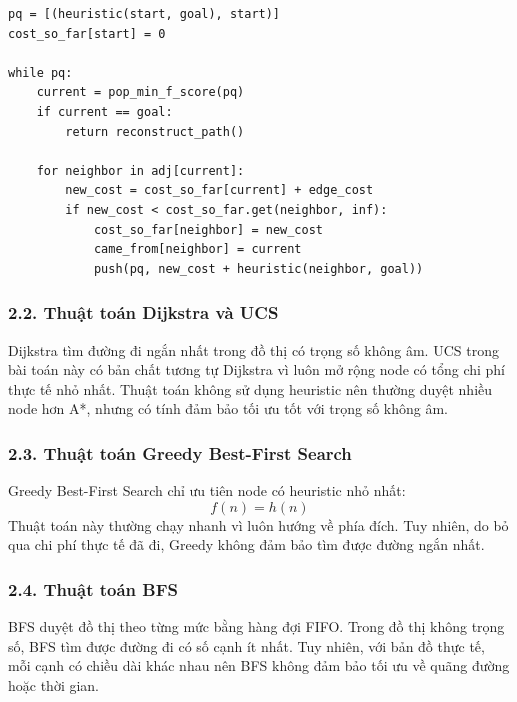 \documentclass[12pt,a4paper]{article}
\begin{document}
\begin{lstlisting}[style=pythonstyle, caption={Ý tưởng cài đặt thuật toán A*}]
pq = [(heuristic(start, goal), start)]
cost_so_far[start] = 0

while pq:
    current = pop_min_f_score(pq)
    if current == goal:
        return reconstruct_path()

    for neighbor in adj[current]:
        new_cost = cost_so_far[current] + edge_cost
        if new_cost < cost_so_far.get(neighbor, inf):
            cost_so_far[neighbor] = new_cost
            came_from[neighbor] = current
            push(pq, new_cost + heuristic(neighbor, goal))
\end{lstlisting}

\subsubsection*{2.2. Thuật toán Dijkstra và UCS}

Dijkstra tìm đường đi ngắn nhất trong đồ thị có trọng số không âm. UCS trong bài toán này có bản chất tương tự Dijkstra vì luôn mở rộng node có tổng chi phí thực tế nhỏ nhất. Thuật toán không sử dụng heuristic nên thường duyệt nhiều node hơn A*, nhưng có tính đảm bảo tối ưu tốt với trọng số không âm.

\subsubsection*{2.3. Thuật toán Greedy Best-First Search}

Greedy Best-First Search chỉ ưu tiên node có heuristic nhỏ nhất:
\[
f(n)=h(n)
\]
Thuật toán này thường chạy nhanh vì luôn hướng về phía đích. Tuy nhiên, do bỏ qua chi phí thực tế đã đi, Greedy không đảm bảo tìm được đường ngắn nhất.

\subsubsection*{2.4. Thuật toán BFS}

BFS duyệt đồ thị theo từng mức bằng hàng đợi FIFO. Trong đồ thị không trọng số, BFS tìm được đường đi có số cạnh ít nhất. Tuy nhiên, với bản đồ thực tế, mỗi cạnh có chiều dài khác nhau nên BFS không đảm bảo tối ưu về quãng đường hoặc thời gian.
\end{document}
